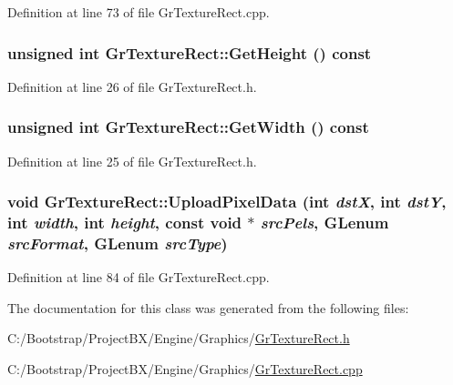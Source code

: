 Definition at line 73 of file GrTextureRect.cpp.\hypertarget{class_gr_texture_rect_c6be29f7af211b67722dc48ffaa232df}{
\subsubsection[{GetHeight}]{\setlength{\rightskip}{0pt plus 5cm}unsigned int GrTextureRect::GetHeight () const}}
\label{class_gr_texture_rect_c6be29f7af211b67722dc48ffaa232df}




Definition at line 26 of file GrTextureRect.h.\hypertarget{class_gr_texture_rect_7e4df2f17a93340ba6bb98ab707dbe83}{
\subsubsection[{GetWidth}]{\setlength{\rightskip}{0pt plus 5cm}unsigned int GrTextureRect::GetWidth () const}}
\label{class_gr_texture_rect_7e4df2f17a93340ba6bb98ab707dbe83}




Definition at line 25 of file GrTextureRect.h.\hypertarget{class_gr_texture_rect_25477360df1bff07b870f655524d32fb}{
\subsubsection[{UploadPixelData}]{\setlength{\rightskip}{0pt plus 5cm}void GrTextureRect::UploadPixelData (int {\em dstX}, \/  int {\em dstY}, \/  int {\em width}, \/  int {\em height}, \/  const void $\ast$ {\em srcPels}, \/  GLenum {\em srcFormat}, \/  GLenum {\em srcType})}}
\label{class_gr_texture_rect_25477360df1bff07b870f655524d32fb}




Definition at line 84 of file GrTextureRect.cpp.

The documentation for this class was generated from the following files:\begin{CompactItemize}
\item 
C:/Bootstrap/ProjectBX/Engine/Graphics/\hyperlink{_gr_texture_rect_8h}{GrTextureRect.h}\item 
C:/Bootstrap/ProjectBX/Engine/Graphics/\hyperlink{_gr_texture_rect_8cpp}{GrTextureRect.cpp}\end{CompactItemize}
